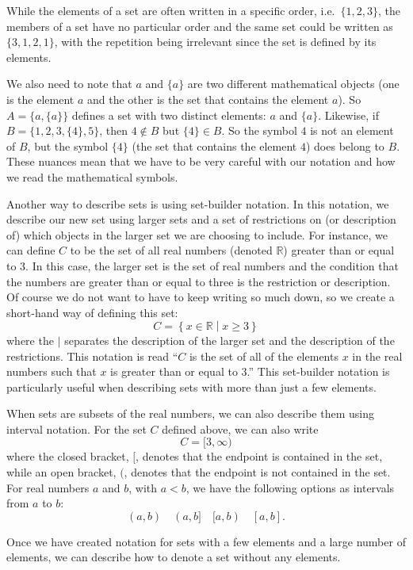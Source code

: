 \documentclass[
]{book}
\theoremstyle{definition}
\theoremstyle{definition}
\theoremstyle{definition}
\theoremstyle{remark}
\begin{document}
While the elements of a set are often written in a specific order, i.e.~\(\{1,2,3\}\), the members of a set have no particular order and the same set could be written as \(\{3, 1, 2, 1\}\), with the repetition being irrelevant since the set is defined by its elements.

We also need to note that \(a\) and \(\{a\}\) are two different mathematical objects (one is the element \(a\) and the other is the set that contains the element \(a\)). So \(A = \{a, \{a\}\}\) defines a set with two distinct elements: \(a\) and \(\{a\}\). Likewise, if \(B=\{1, 2, 3, \{4\}, 5\}\), then \(4\notin B\) but \(\{4\}\in B\). So the symbol \(4\) is not an element of \(B\), but the symbol \(\{4\}\) (the set that contains the element \(4\)) does belong to \(B\). These nuances mean that we have to be very careful with our notation and how we read the mathematical symbols.

Another way to describe sets is using set-builder notation. In this notation, we describe our new set using larger sets and a set of restrictions on (or description of) which objects in the larger set we are choosing to include. For instance, we can define \(C\) to be the set of all real numbers (denoted \(\mathbb{R}\)) greater than or equal to \(3\). In this case, the larger set is the set of real numbers and the condition that the numbers are greater than or equal to three is the restriction or description. Of course we do not want to have to keep writing so much down, so we create a short-hand way of defining this set:
\[ C = \left\{ x\in \mathbb{R} \middle \vert x\geq 3\right\}\] where the \(\vert\) separates the description of the larger set and the description of the restrictions. This notation is read ``\(C\) is the set of all of the elements \(x\) in the real numbers such that \(x\) is greater than or equal to 3.'' This set-builder notation is particularly useful when describing sets with more than just a few elements.

When sets are subsets of the real numbers, we can also describe them using interval notation. For the set \(C\) defined above, we can also write
\[C=[3,\infty)\] where the closed bracket, \([\), denotes that the endpoint is contained in the set, while an open bracket, \((\), denotes that the endpoint is not contained in the set. For real numbers \(a\) and \(b\), with \(a<b\), we have the following options as intervals from \(a\) to \(b\):
\[ (a,b) \quad (a,b] \quad [a,b) \quad [a,b] .\]

Once we have created notation for sets with a few elements and a large number of elements, we can describe how to denote a set without any elements.
\end{document}
